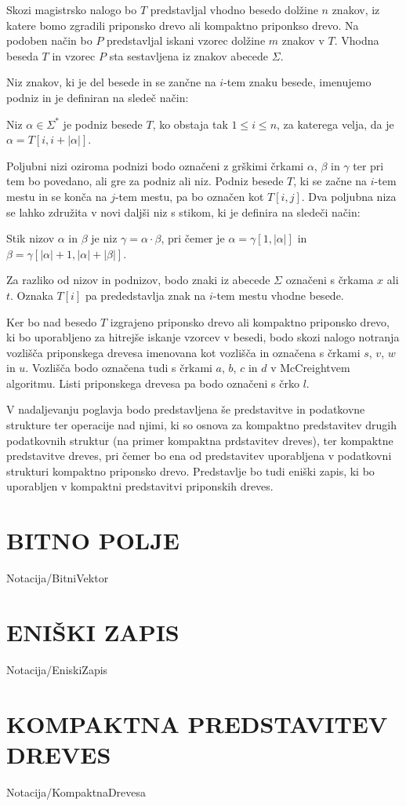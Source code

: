 Skozi magistrsko nalogo bo $T$ predstavljal vhodno besedo dolžine $n$ znakov, iz katere bomo zgradili priponsko drevo ali kompaktno priponkso drevo. Na podoben način bo $P$ predstavljal iskani vzorec dolžine $m$ znakov v $T$. Vhodna beseda $T$ in vzorec $P$ sta sestavljena iz znakov abecede $\Sigma$.

Niz znakov, ki je del besede in se zančne na $i$-tem znaku besede, imenujemo podniz in je definiran na sledeč način:
\begin{defi}
    Niz $\alpha\in\Sigma^*$ je podniz besede $T$, ko obstaja tak $1\le i\le n$, za katerega velja, da je  $\alpha=T[i,i+|\alpha|]$. 
\end{defi}
Poljubni nizi oziroma podnizi bodo označeni z grškimi črkami $\alpha$, $\beta$ in $\gamma$ ter pri tem bo povedano, ali gre za podniz ali niz. Podniz besede $T$, ki se začne na $i$-tem mestu in se konča na $j$-tem mestu, pa bo označen kot $T[i,j]$. Dva poljubna niza se lahko združita v novi daljši niz s stikom, ki je definira na sledeči način:
\begin{defi}
    Stik nizov $\alpha$ in $\beta$ je niz $\gamma=\alpha\cdot\beta$, pri čemer je $\alpha=\gamma[1,|\alpha|]$ in $\beta=\gamma[|\alpha|+1,|\alpha|+|\beta|]$.
\end{defi}

Za razliko od nizov in podnizov, bodo znaki iz abecede $\Sigma$ označeni s črkama $x$ ali $t$. Oznaka $T[i]$ pa prededstavlja znak na $i$-tem mestu vhodne besede.

Ker bo nad besedo $T$ izgrajeno priponsko drevo ali kompaktno priponsko drevo, ki bo uporabljeno za hitrejše iskanje vzorcev v besedi, bodo skozi nalogo notranja vozlišča priponskega drevesa imenovana kot vozlišča in označena s črkami $s$, $v$, $w$ in $u$. Vozlišča bodo označena tudi s črkami $a$, $b$, $c$ in $d$ v McCreightvem algoritmu. Listi priponskega drevesa pa bodo označeni s črko $l$.

V nadaljevanju poglavja bodo predstavljena še predstavitve in podatkovne strukture ter operacije nad njimi, ki so osnova za kompaktno predstavitev drugih podatkovnih struktur (na primer kompaktna prdstavitev dreves), ter kompaktne predstavitve dreves, pri čemer bo ena od predstavitev uporabljena v podatkovni strukturi kompaktno priponsko drevo. Predstavlje bo tudi eniški zapis, ki bo uporabljen v kompaktni predstavitvi priponskih dreves.

\section{BITNO POLJE}\label{sec:Bitno_Polje}
{Notacija/BitniVektor}

\section{ENIŠKI ZAPIS}\label{sec:Eniski_Zapis}
{Notacija/EniskiZapis}

\section{KOMPAKTNA PREDSTAVITEV DREVES}\label{sec:kompaktna_drevesa}
{Notacija/KompaktnaDrevesa}